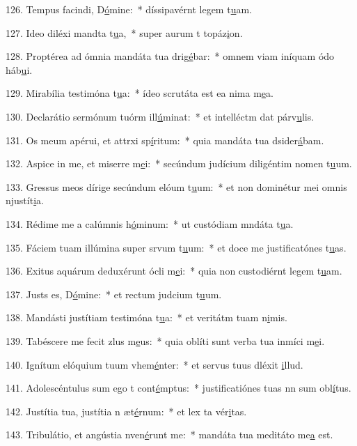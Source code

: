 126. Tempus facindi, D\uline{ó}mine:~* díssipavérnt legem t\uline{u}am.\par 
127. Ideo diléxi mandta t\uline{u}a,~* super aurum t topáz\uline{i}on.\par 
128. Proptérea ad ómnia mandáta tua drig\uline{é}bar:~* omnem viam iníquam ódo háb\uline{u}i.\par 
129. Mirabília testimóna t\uline{u}a:~* ídeo scrutáta est ea nima m\uline{e}a.\par 
130. Declarátio sermónum tuórm ill\uline{ú}minat:~* et intelléctm dat párv\uline{u}lis.\par 
131. Os meum apérui, et attrxi sp\uline{í}ritum:~* quia mandáta tua dsider\uline{á}bam.\par 
132. Aspice in me, et miserre m\uline{e}i:~* secúndum judícium diligéntim nomen t\uline{u}um.\par 
133. Gressus meos dírige secúndum elóum t\uline{u}um:~* et non dominétur mei omnis njustít\uline{i}a.\par 
134. Rédime me a calúmnis h\uline{ó}minum:~* ut custódiam mndáta t\uline{u}a.\par 
135. Fáciem tuam illúmina super srvum t\uline{u}um:~* et doce me justificatónes t\uline{u}as.\par 
136. Exitus aquárum deduxérunt ócli m\uline{e}i:~* quia non custodiérnt legem t\uline{u}am.\par 
137. Justs es, D\uline{ó}mine:~* et rectum judcium t\uline{u}um.\par 
138. Mandásti justítiam testimóna t\uline{u}a:~* et veritátm tuam n\uline{i}mis.\par 
139. Tabéscere me fecit zlus m\uline{e}us:~* quia oblíti sunt verba tua inmíci m\uline{e}i.\par 
140. Ignítum elóquium tuum vhem\uline{é}nter:~* et servus tuus dléxit \uline{i}llud.\par 
141. Adolescéntulus sum ego t cont\uline{é}mptus:~* justificatiónes tuas nn sum obl\uline{í}tus.\par 
142. Justítia tua, justítia n æt\uline{é}rnum:~* et lex ta vér\uline{i}tas.\par 
143. Tribulátio, et angústia nven\uline{é}runt me:~* mandáta tua meditáto me\uline{a} est.\par 
